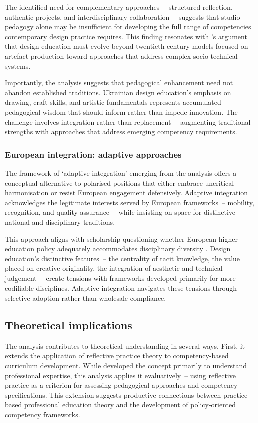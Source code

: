 \documentclass[ed]{acnsart}
\begin{document}
	The identified need for complementary approaches~-- structured reflection, authentic projects, and interdisciplinary collaboration~-- suggests that studio pedagogy alone may be insufficient for developing the full range of competencies contemporary design practice requires. This finding resonates with \citeauthor{Davis202397}'s argument that design education must evolve beyond twentieth-century models focused on artefact production toward approaches that address complex socio-technical systems.
	
	Importantly, the analysis suggests that pedagogical enhancement need not abandon established traditions. Ukrainian design education's emphasis on drawing, craft skills, and artistic fundamentals represents accumulated pedagogical wisdom that should inform rather than impede innovation. The challenge involves integration rather than replacement~-- augmenting traditional strengths with approaches that address emerging competency requirements.
	
	\subsubsection{European integration: adaptive approaches}
	
	The framework of `adaptive integration' emerging from the analysis offers a conceptual alternative to polarised positions that either embrace uncritical harmonisation or resist European engagement defensively. Adaptive integration acknowledges the legitimate interests served by European frameworks~-- mobility, recognition, and quality assurance~-- while insisting on space for distinctive national and disciplinary traditions.
	
	This approach aligns with scholarship questioning whether European higher education policy adequately accommodates disciplinary diversity \cite{Bohlinger2012279}. Design education's distinctive features~-- the centrality of tacit knowledge, the value placed on creative originality, the integration of aesthetic and technical judgement~-- create tensions with frameworks developed primarily for more codifiable disciplines. Adaptive integration navigates these tensions through selective adoption rather than wholesale compliance.
	
	\subsection{Theoretical implications}
	
	The analysis contributes to theoretical understanding in several ways. First, it extends the application of reflective practice theory to competency-based curriculum development. While \citet{Schon1983} developed the concept primarily to understand professional expertise, this analysis applies it evaluatively~-- using reflective practice as a criterion for assessing pedagogical approaches and competency specifications. This extension suggests productive connections between practice-based professional education theory and the development of policy-oriented competency frameworks.
	
\end{document}
